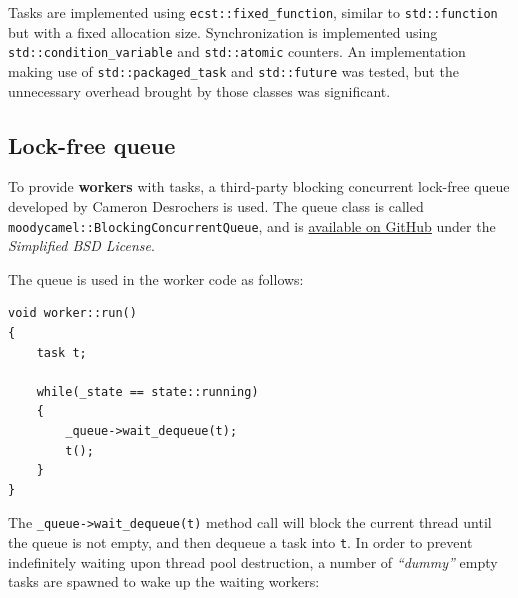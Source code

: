\documentclass[twoside, 12pt, a4paper, openright]{book}
\begin{document}
Tasks are implemented using
\texttt{ecst::fixed_function},
similar to
\texttt{std::function}
but with a fixed allocation size. Synchronization is implemented using
\texttt{std::condition_variable}
and
\texttt{std::atomic}
counters. An implementation making use of
\texttt{std::packaged_task}
and
\texttt{std::future}
was tested, but the unnecessary overhead brought by those classes was
significant.

\subsection{Lock-free queue}\label{lock-free-queue}

To provide \textbf{workers} with tasks, a third-party blocking
concurrent lock-free queue developed by Cameron Desrochers is used. The
queue class is called
\texttt{moodycamel::BlockingConcurrentQueue},
and is \href{https://github.com/cameron314/concurrentqueue}{available on
GitHub} under the \emph{Simplified BSD License}.

The queue is used in the worker code as follows:

\begin{verbatim}
void worker::run()
{
    task t;

    while(_state == state::running)
    {
        _queue->wait_dequeue(t);
        t();
    }
}
\end{verbatim}

The
\texttt{_queue->wait_dequeue(t)}
method call will block the current thread until the queue is not empty,
and then dequeue a task into
\texttt{t}.
In order to prevent indefinitely waiting upon thread pool destruction, a
number of \emph{``dummy''} empty tasks are spawned to wake up the
waiting workers:
\end{document}

